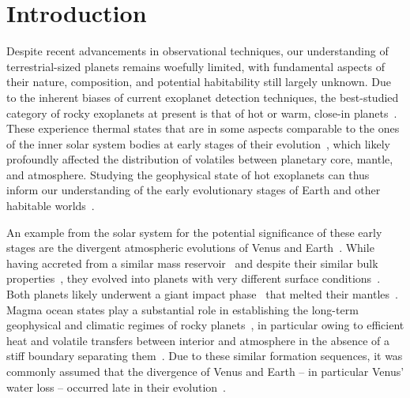\documentclass[twocolumn,twocolappendix,linenumbers]{aastex631}
\begin{document}
\section{Introduction}
Despite recent advancements in observational techniques, our understanding of terrestrial-sized planets remains woefully limited, with fundamental aspects of their nature, composition, and potential habitability still largely unknown.
Due to the inherent biases of current exoplanet detection techniques, the best-studied category of rocky exoplanets at present is that of hot or warm, close-in planets~\citep{2019AREPS..47..141J,2021JGRE..12606639B}.
These experience thermal states that are in some aspects comparable to the ones of the inner solar system bodies at early stages of their evolution~\citep{Ikoma2018,2021ChEG...81l5735C}, which likely profoundly affected the distribution of volatiles between planetary core, mantle, and atmosphere.
Studying the geophysical state of hot exoplanets can thus inform our understanding of the early evolutionary stages of Earth and other habitable worlds~\citep{Lichtenberg2022,Krijt2022}.

An example from the solar system for the potential significance of these early stages are the divergent atmospheric evolutions of Venus and Earth~\citep[e.g.,][]{2019JGRE..124.2015K,2021JGRE..12606643K,Salvador2023b}.
While having accreted from a similar mass reservoir~\citep{2020plas.book..287R,2020SSRv..216...55K,2020SSRv..216...27M,2020plas.book....3Z} and despite their similar bulk properties~\citep{Smrekar2018}, they evolved into planets with very different surface conditions~\citep{1982Sci...216..630D,Kasting1988,Hamano2013,Kane2014,Way2020,Turbet2021}.
Both planets likely underwent a giant impact phase~\citep{2020plas.book..287R,2020NatGe..13..265G,Liu2022} that melted their mantles~\citep{2012AREPS..40..113E,2018RSPTA.37680109S,Lichtenberg2022}.
Magma ocean states play a substantial role in establishing the long-term geophysical and climatic regimes of rocky planets~\citep{2020ChEG...80l5594F}, in particular owing to efficient heat and volatile transfers between interior and atmosphere in the absence of a stiff boundary separating them~\citep{2021ApJ...909L..22K,Dorn2021,Salvador2023b}.
Due to these similar formation sequences, it was commonly assumed that the divergence of Venus and Earth -- in particular Venus' water loss -- occurred late in their evolution~\citep[e.g.,][]{Way2020}.
\end{document}
